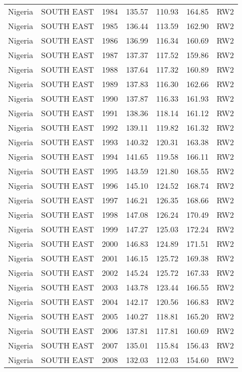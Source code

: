 \begin{longtable}{lllrrrl}
  Nigeria & SOUTH EAST & 1984 & 135.57 & 110.93 & 164.85 & RW2 \\ 
  Nigeria & SOUTH EAST & 1985 & 136.44 & 113.59 & 162.90 & RW2 \\ 
  Nigeria & SOUTH EAST & 1986 & 136.99 & 116.34 & 160.69 & RW2 \\ 
  Nigeria & SOUTH EAST & 1987 & 137.37 & 117.52 & 159.86 & RW2 \\ 
  Nigeria & SOUTH EAST & 1988 & 137.64 & 117.32 & 160.89 & RW2 \\ 
  Nigeria & SOUTH EAST & 1989 & 137.83 & 116.30 & 162.66 & RW2 \\ 
  Nigeria & SOUTH EAST & 1990 & 137.87 & 116.33 & 161.93 & RW2 \\ 
  Nigeria & SOUTH EAST & 1991 & 138.36 & 118.14 & 161.12 & RW2 \\ 
  Nigeria & SOUTH EAST & 1992 & 139.11 & 119.82 & 161.32 & RW2 \\ 
  Nigeria & SOUTH EAST & 1993 & 140.32 & 120.31 & 163.38 & RW2 \\ 
  Nigeria & SOUTH EAST & 1994 & 141.65 & 119.58 & 166.11 & RW2 \\ 
  Nigeria & SOUTH EAST & 1995 & 143.59 & 121.80 & 168.55 & RW2 \\ 
  Nigeria & SOUTH EAST & 1996 & 145.10 & 124.52 & 168.74 & RW2 \\ 
  Nigeria & SOUTH EAST & 1997 & 146.21 & 126.35 & 168.66 & RW2 \\ 
  Nigeria & SOUTH EAST & 1998 & 147.08 & 126.24 & 170.49 & RW2 \\ 
  Nigeria & SOUTH EAST & 1999 & 147.27 & 125.03 & 172.24 & RW2 \\ 
  Nigeria & SOUTH EAST & 2000 & 146.83 & 124.89 & 171.51 & RW2 \\ 
  Nigeria & SOUTH EAST & 2001 & 146.15 & 125.72 & 169.38 & RW2 \\ 
  Nigeria & SOUTH EAST & 2002 & 145.24 & 125.72 & 167.33 & RW2 \\ 
  Nigeria & SOUTH EAST & 2003 & 143.78 & 123.44 & 166.55 & RW2 \\ 
  Nigeria & SOUTH EAST & 2004 & 142.17 & 120.56 & 166.83 & RW2 \\ 
  Nigeria & SOUTH EAST & 2005 & 140.27 & 118.81 & 165.20 & RW2 \\ 
  Nigeria & SOUTH EAST & 2006 & 137.81 & 117.81 & 160.69 & RW2 \\ 
  Nigeria & SOUTH EAST & 2007 & 135.01 & 115.84 & 156.43 & RW2 \\ 
  Nigeria & SOUTH EAST & 2008 & 132.03 & 112.03 & 154.60 & RW2 \\ 

\end{longtable}
